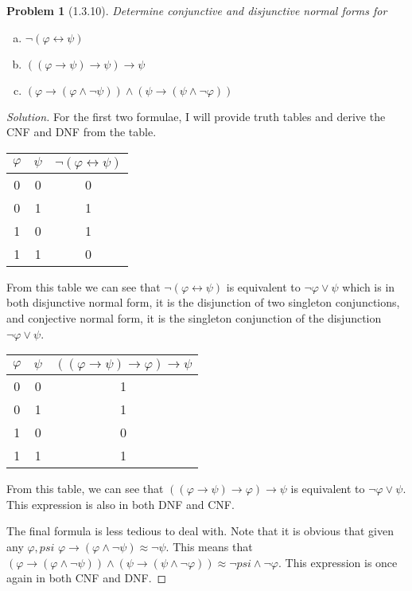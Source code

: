 \documentclass[letter]{article}
\newtheorem{problem}{Problem}
\theoremstyle{definition}
\newenvironment{solution}
{\begin{proof}[Solution]}
	{\end{proof}}
\renewcommand{\phi}{\varphi}
\begin{document}
\begin{problem}[1.3.10] Determine conjunctive and disjunctive normal forms for
\begin{enumerate}[(a)]
    \item $\neg (\phi \leftrightarrow \psi)$
    \item $((\phi \to \psi) \to \psi) \to \psi$
    \item $(\phi \to (\phi \land \neg \psi)) \land (\psi \to (\psi \land \neg \phi))$
\end{enumerate}
\end{problem}
\begin{solution}
For the first two formulae, I will provide truth tables and derive the CNF and DNF from the table.\\
\begin{center}
\begin{tabular}{|c|c|c|}
  \hline
  $\phi$ & $\psi$ & $\lnot (\phi \leftrightarrow \psi)$\\
  \hline
  0 & 0 & 0 \\
  \hline
  0 & 1 & 1 \\
  \hline
  1 & 0 & 1\\
  \hline
  1 & 1 & 0\\
  \hline
\end{tabular}
\end{center}  

From this table we can see that $\lnot (\phi \leftrightarrow \psi)$ is equivalent to $\lnot \phi \lor \psi$ which is in both disjunctive normal form, it is the disjunction of two singleton conjunctions, and conjective normal form, it is the singleton conjunction of the disjunction $\lnot \phi \lor \psi$.

\begin{center}
\begin{tabular}{|c|c|c|}
  \hline
  $\phi$ & $\psi$ & $((\phi \to \psi) \to \phi) \to \psi$\\
  \hline
  0 & 0 & 1 \\
  \hline
  0 & 1 & 1 \\
  \hline
  1 & 0 & 0\\
  \hline
  1 & 1 & 1\\
  \hline
\end{tabular}
\end{center}  

From this table, we can see that  $((\phi \to \psi) \to \phi) \to \psi$ is equivalent to $\lnot \phi \lor \psi$. This expression is also in both DNF and CNF.

The final formula is less tedious to deal with. Note that it is obvious that given any $\phi,psi$ $\phi \to (\phi \land \lnot \psi) \approx \lnot \psi$. This means that  $(\phi \to (\phi \land \neg \psi)) \land (\psi \to (\psi \land \neg \phi)) \approx \lnot psi \land \lnot \phi$. This expression is once again in both CNF and DNF.

\end{solution}
\end{document}
